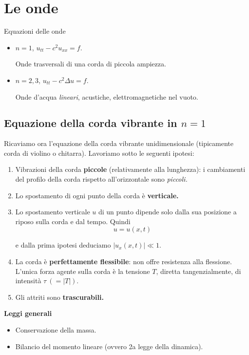 \documentclass[10pt,a4paper,twoside,openright]{book}
\begin{document}
\chapter{Le onde}

Equazioni delle onde
\begin{itemize}
	\item $\displaystyle n=1$, $\displaystyle u_{tt} -c^{2} u_{xx} =f$.
	      
	      Onde trasversali di una corda di piccola ampiezza.
	\item $\displaystyle n=2,3$, $\displaystyle u_{tt} -c^{2} \Delta u=f$.
	      
	      Onde d'acqua \textit{lineari}, acustiche, elettromagnetiche nel vuoto.
\end{itemize}

\section{Equazione della corda vibrante in \texorpdfstring{$n=1$}{n=1}}

Ricaviamo ora l'equazione della corda vibrante unidimensionale (tipicamente corda di violino o chitarra). Lavoriamo sotto le seguenti ipotesi:
\begin{enumerate}
	\item Vibrazioni della corda \textbf{piccole} (relativamente alla lunghezza): i cambiamenti del profilo della corda rispetto all'orizzontale sono \textit{piccoli.}
	\item Lo spostamento di ogni punto della corda è \textbf{verticale.}
	\item Lo spostamento verticale $\displaystyle u$ di un punto dipende solo dalla sua posizione a riposo sulla corda e dal tempo. Quindi\begin{equation*}
	      u=u( x,t)
	\end{equation*}
	
	e dalla prima ipotesi deduciamo $\displaystyle | u_{x}( x,t)| \ll 1$.
	\item La corda è \textbf{perfettamente flessibile}: non offre resistenza alla flessione. L'unica forza agente sulla corda è la tensione $\displaystyle T$, diretta tangenzialmente, di intensità $\displaystyle \tau \ ( =| T| )$.
	\item Gli attriti sono \textbf{trascurabili.}
\end{enumerate}



\textbf{Leggi generali}
\begin{itemize}
	\item Conservazione della massa.
	\item Bilancio del momento lineare (ovvero 2a legge della dinamica).
\end{itemize}
\end{document}

